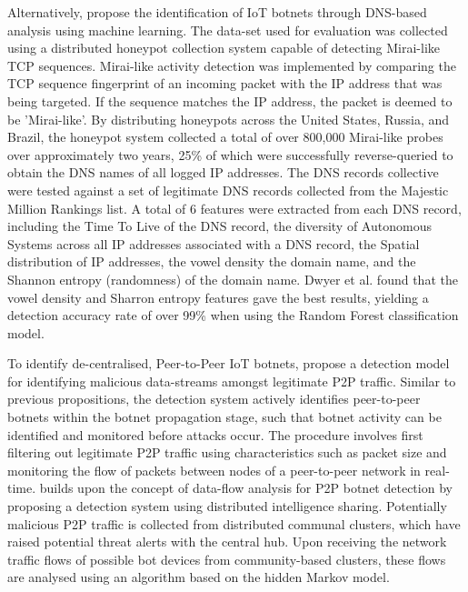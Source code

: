 Alternatively, \citet{Dwyer2019} propose the identification of IoT botnets through DNS-based analysis using machine learning. The data-set used for evaluation was collected using a distributed honeypot collection system capable of detecting Mirai-like TCP sequences. Mirai-like activity detection was implemented by comparing the TCP sequence fingerprint of an incoming packet with the IP address that was being targeted. If the sequence matches the IP address, the packet is deemed to be 'Mirai-like'. By distributing honeypots across the United States, Russia, and Brazil, the honeypot system collected a total of over 800,000 Mirai-like probes over approximately two years, 25\% of which were successfully reverse-queried to obtain the DNS names of all logged IP addresses. The DNS records collective were tested against a set of legitimate DNS records collected from the Majestic Million Rankings list. A total of 6 features were extracted from each DNS record, including the Time To Live of the DNS record, the diversity of Autonomous Systems across all IP addresses associated with a DNS record, the Spatial distribution of IP addresses, the vowel density the domain name, and the Shannon entropy (randomness) of the domain name. Dwyer et al. found that the vowel density and Sharron entropy features gave the best results, yielding a detection accuracy rate of over 99\% when using the Random Forest classification model.

To identify de-centralised, Peer-to-Peer IoT botnets, \citet{Wang2017} propose a detection model for identifying malicious data-streams amongst legitimate P2P traffic. Similar to previous propositions, the detection system actively identifies peer-to-peer botnets within the botnet propagation stage, such that botnet activity can be identified and monitored before attacks occur. The procedure involves first filtering out legitimate P2P traffic using characteristics such as packet size and monitoring the flow of packets between nodes of a peer-to-peer network in real-time. \citet{Li2019} builds upon the concept of data-flow analysis for P2P botnet detection by proposing a detection system using distributed intelligence sharing. Potentially malicious P2P traffic is collected from distributed communal clusters, which have raised potential threat alerts with the central hub. Upon receiving the network traffic flows of possible bot devices from community-based clusters, these flows are analysed using an algorithm based on the hidden Markov model.

